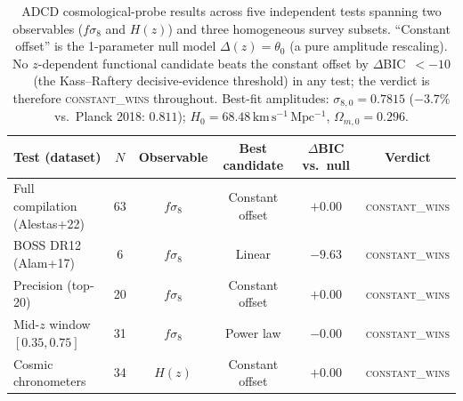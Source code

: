 \begin{table}[H]
\centering\footnotesize
\caption{ADCD cosmological-probe results across five independent tests spanning
two observables ($f\sigma_8$ and $H(z)$) and three homogeneous survey subsets.
``Constant offset'' is the 1-parameter null model $\Delta(z)=\theta_0$ (a pure
amplitude rescaling). No $z$-dependent functional candidate beats the constant
offset by $\Delta$BIC~$<-10$ (the Kass--Raftery decisive-evidence threshold) in
any test; the verdict is therefore \textsc{constant\_wins} throughout. Best-fit
amplitudes: $\sigma_{8,0}=0.7815$ ($-3.7\%$ vs.\ Planck 2018: $0.811$);
$H_0=68.48\,\mathrm{km\,s^{-1}\,Mpc^{-1}}$, $\Omega_{m,0}=0.296$.}
\label{tab:cosmological_probes}
\setlength{\tabcolsep}{5pt}
\begin{tabularx}{\textwidth}{L c c c c c}
\toprule
\textbf{Test (dataset)} & \textbf{$N$} & \textbf{Observable} & \textbf{Best candidate} & \textbf{$\Delta$BIC vs.\ null} & \textbf{Verdict} \\
\midrule
Full compilation (Alestas+22)        & 63 & $f\sigma_8$ & Constant offset          & $+0.00$  & \textsc{constant\_wins} \\
BOSS DR12 (Alam+17)                  & 6  & $f\sigma_8$ & Linear                   & $-9.63$  & \textsc{constant\_wins} \\
Precision (top-20)                   & 20 & $f\sigma_8$ & Constant offset          & $+0.00$  & \textsc{constant\_wins} \\
Mid-$z$ window $[0.35,0.75]$         & 31 & $f\sigma_8$ & Power law                & $-0.00$  & \textsc{constant\_wins} \\
Cosmic chronometers                  & 34 & $H(z)$      & Constant offset          & $+0.00$  & \textsc{constant\_wins} \\
\bottomrule
\end{tabularx}
\end{table}
